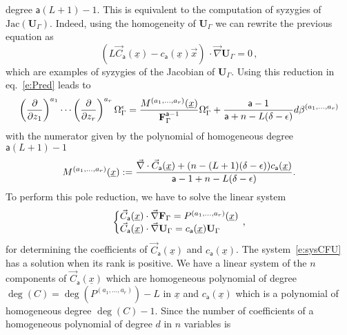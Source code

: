 \documentclass[a4paper,12pt]{article}
\numberwithin{equation}{section}
\numberwithin{figure}{section}
\begin{document}
degree $\mathsf{a}(L+1)-1$. This is equivalent to the computation of syzygies of $\text{Jac}( \mathbf U_\Gamma)$. Indeed,  using the homogeneity of $\mathbf{U}_\Gamma$ we can rewrite the previous equation as 
\begin{equation}
 \left( L   \vec
C_{\mathsf{a}}(\underline x) -
c_{\mathsf{a}}(\underline x) \vec{x} \right) \, \cdot\vec\nabla
\mathbf{U}_\Gamma =0\, ,
\end{equation}
which are examples of syzygies of the Jacobian of $\mathbf U_\Gamma$. Using this reduction in eq.~\eqref{e:Pred} leads to
% 
\begin{equation}\label{e:RedFinal}
\left(\partial\over \partial z_1\right)^{a_1}\cdots\left(\partial
  \over\partial z_r\right)^{a_r} \Omega_\Gamma^\epsilon={
M^{(a_1,\dots,a_r)}
     (\underline x)
\over \textbf{F}_\Gamma^{\mathsf{a}-1}}\Omega_\Gamma^\epsilon
+{  \mathsf{a}-1\over \mathsf{a}+n-L(\delta-\epsilon)} d\beta^{(a_1,\dots,a_r)}
\end{equation}
with the numerator given by the polynomial of homogeneous degree $\mathsf{a}(L+1)-1$
\begin{equation}
  \label{e:Mfinal}
  M^{(a_1,\dots,a_r)}(\underline x):={\vec\nabla \cdot \vec C_{\mathsf{a}}
     (\underline x)
+  (n-(L+1)(\delta-\epsilon)) 
    c_{\mathsf{a}}(\underline x)\over \mathsf{a}-1+n-L(\delta-\epsilon) }.
\end{equation}
%
To perform this pole reduction, 
 we have to solve the linear system
\begin{equation}\label{e:sysCFU}
   \left\{\begin{array}{@{}l@{}}
\vec C_{\mathsf{a}} (\underline x) \cdot \vec \nabla \textbf{F}_\Gamma
            =    P^{(a_1,\dots,a_r)}(\underline x)\\
\vec C_{\mathsf{a}} (\underline x)\cdot\vec \nabla\textbf{U}_\Gamma= c_{{\mathsf{a}}}(\underline x) \textbf{U}_\Gamma 
  \end{array}\right.\,,
\end{equation}
for determining the coefficients of $\vec C_{\mathsf{a}}(\underline
x)$ and $c_{\mathsf{a}}(\underline x)$.
%
The system~\eqref{e:sysCFU} has a solution when its rank is positive.
We have a linear system of the $n$ components of $\vec C_{\mathsf{a}}(\underline
x) $ which are homogeneous polynomial of degree $\deg(C)=\deg( P^{(a_1,\dots,a_r)})-L $ in
$\underline x$ and  $ c_{{\mathsf{a}}}(\underline x) $ which is a polynomial of
homogeneous degree $\deg(C)-1$.   Since the number of coefficients of
a homogeneous polynomial of degree $d$ in $n$ variables is
\end{document}
